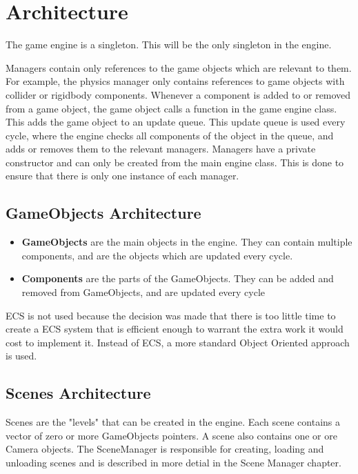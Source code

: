 \section{Architecture}
\label{sec:architecture}
The game engine is a singleton. This will be the only singleton in the engine.

Managers contain only references to the game objects which are relevant to them. For example, the physics manager only contains references to game objects with collider or rigidbody components.
Whenever a component is added to or removed from a game object, the game object calls a function in the game engine class. This adds the game object to an update queue. This update queue is used every cycle, where the engine checks all components of the object in the queue, and adds or removes them to the relevant managers.
Managers have a private constructor and can only be created from the main engine class. This is done to ensure that there is only one instance of each manager.

\subsection{GameObjects Architecture}
\begin{itemize}
    \item \textbf{GameObjects} are the main objects in the engine. They can contain multiple components, and are the objects which are updated every cycle.
    \item \textbf{Components} are the parts of the GameObjects. They can be added and removed from GameObjects, and are updated every cycle
\end{itemize}
ECS is not used because the decision was made that there is too little time to create a ECS system that is efficient enough to warrant the extra work it would cost to implement it.
Instead of ECS, a more standard Object Oriented approach is used.

\subsection{Scenes Architecture}
Scenes are the "levels" that can be created in the engine. Each scene contains a vector of zero or more GameObjects pointers.
A scene also contains one or ore Camera objects.
The SceneManager is responsible for creating, loading and unloading scenes and is described in more detial in the Scene Manager chapter.













